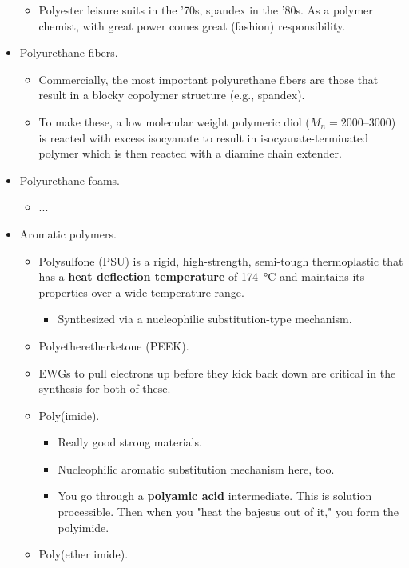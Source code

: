 \documentclass[../notes.tex]{subfiles}
\begin{document}
\begin{itemize}
\begin{itemize}
        \item Polyester leisure suits in the '70s, spandex in the '80s. As a polymer chemist, with great power comes great (fashion) responsibility.
    \end{itemize}
    \item Polyurethane fibers.
    \begin{itemize}
        \item Commercially, the most important polyurethane fibers are those that result in a blocky copolymer structure (e.g., spandex).
        \item To make these, a low molecular weight polymeric diol ($M_n=\numrange{2000}{3000}$) is reacted with excess isocyanate to result in isocyanate-terminated polymer which is then reacted with a diamine chain extender.
    \end{itemize}
    \item Polyurethane foams.
    \begin{itemize}
        \item ...
    \end{itemize}
    \item Aromatic polymers.
    \begin{itemize}
        \item Polysulfone (PSU) is a rigid, high-strength, semi-tough thermoplastic that has a \textbf{heat deflection temperature} of \SI{174}{\celsius} and maintains its properties over a wide temperature range.
        \begin{itemize}
            \item Synthesized via a nucleophilic substitution-type mechanism.
        \end{itemize}
        \item Polyetheretherketone (PEEK).
        \item EWGs to pull electrons up before they kick back down are critical in the synthesis for both of these.
        \item Poly(imide).
        \begin{itemize}
            \item Really good strong materials.
            \item Nucleophilic aromatic substitution mechanism here, too.
            \item You go through a \textbf{polyamic acid} intermediate. This is solution processible. Then when you "heat the bajesus out of it," you form the polyimide.
        \end{itemize}
        \item Poly(ether imide).

\end{itemize}
\end{itemize}
\end{document}
